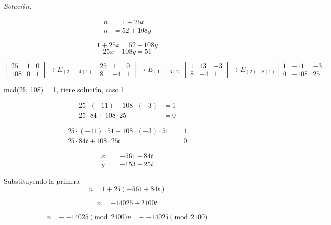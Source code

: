 \documentclass{amsart}
\begin{document}
{\it Solución: }


\begin{align*}
	n &= 1 + 25x \\
	n &= 52 + 108y
\end{align*}

$$
	1 + 25x = 52 + 108y
$$
$$
	25x - 108y = 51
$$

$$
	\left[\begin{array}{c|cc}
		25  & 1 & 0      \\
		108 & 0 & 1      
	\end{array}\right]
	\to E_{(2) - 4(1)}
	\left[\begin{array}{c|cc}
		25  &  1 & 0      \\
		8   & -4 & 1      
	\end{array}\right]
	\to E_{(1) - 3(2)}
	\left[\begin{array}{c|cc}
		1  &  13 & -3      \\
		8  & -4  &  1      
	\end{array}\right]
	\to E_{(2) - 8(1)}
	\left[\begin{array}{c|cc}
		1  & -11  & -3      \\
		0  & -108 &  25     
	\end{array}\right]
$$

mcd(25, 108) = 1, tiene solución, caso 1

\begin{align*}
	25 \cdot (-11) + 108 \cdot (-3) &= 1 \\
	25 \cdot 84 + 108 \cdot 25 &= 0
\end{align*}

\begin{align*}
	25 \cdot (-11) \cdot 51 + 108 \cdot (-3) \cdot 51 &= 1 \\
	25 \cdot 84 t + 108 \cdot 25 t &= 0
\end{align*}

\begin{align*}
	x &= -561 + 84t \\
	y &= -153 + 25t
\end{align*}

Substituyendo la primera
$$
	n = 1 + 25 (-561 + 84t)
$$

$$
	n = -14025 + 2100t
$$

\begin{align*}
	n &\equiv -14025 \pmod{2100}
	n &\equiv -14025 \pmod{2100}
\end{align*}
\end{document}
